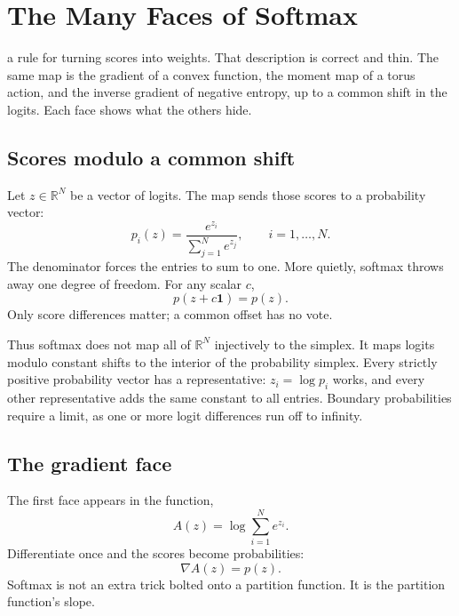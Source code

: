 \chapter{The Many Faces of Softmax}\label{ch:softmax}

 a rule for turning scores into weights. That
description is correct and thin. The same map is the gradient of a convex
function, the moment map of a torus action, and the inverse gradient of
negative entropy, up to a common shift in the logits. Each face shows what
the others hide.

\section{Scores modulo a common shift}

Let $z\in\mathbb{R}^N$ be a vector of logits. The  map sends
those scores to a probability vector:
\begin{equation}
  p_i(z) = \frac{e^{z_i}}{\sum_{j=1}^N e^{z_j}},
  \qquad i=1,\ldots,N.
  \label{eq:softmax}
\end{equation}
The denominator forces the entries to sum to one. More quietly, softmax
throws away one degree of freedom. For any scalar $c$,
\begin{equation}
  p(z+c\mathbf{1})=p(z).
  \label{eq:softmax-shift}
\end{equation}
Only score differences matter; a common offset has no vote.

Thus softmax does not map all of $\mathbb{R}^N$ injectively to the simplex.
It maps logits modulo constant shifts to the interior of the probability
simplex. Every strictly positive probability vector has a representative:
$z_i=\log p_i$ works, and every other representative adds the same constant
to all entries. Boundary probabilities require a limit, as one or more logit
differences run off to infinity.

\section{The gradient face}

The first face appears in the  function,
\begin{equation}
  A(z)=\log\sum_{i=1}^N e^{z_i}.
  \label{eq:log-sum-exp}
\end{equation}
Differentiate once and the scores become probabilities:
\begin{equation}
  \nabla A(z)=p(z).
  \label{eq:softmax-gradient}
\end{equation}
Softmax is not an extra trick bolted onto a partition function. It is the
partition function's slope.

